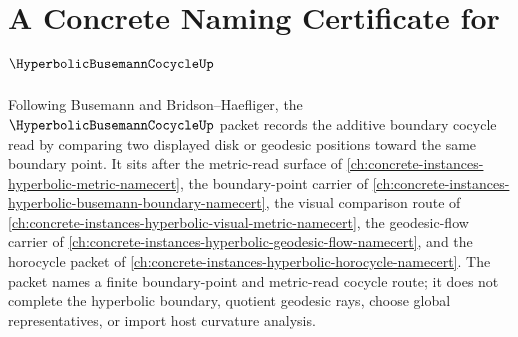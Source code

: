 \chapter{A Concrete Naming Certificate for $\HyperbolicBusemannCocycleUp$}
\label{ch:concrete-instances-hyperbolic-busemann-cocycle-namecert}

Following Busemann and Bridson--Haefliger, the $\HyperbolicBusemannCocycleUp$ packet records the additive boundary cocycle read by comparing two displayed disk or geodesic positions toward the same boundary point. It sits after the metric-read surface of \autoref{ch:concrete-instances-hyperbolic-metric-namecert}, the boundary-point carrier of \autoref{ch:concrete-instances-hyperbolic-busemann-boundary-namecert}, the visual comparison route of \autoref{ch:concrete-instances-hyperbolic-visual-metric-namecert}, the geodesic-flow carrier of \autoref{ch:concrete-instances-hyperbolic-geodesic-flow-namecert}, and the horocycle packet of \autoref{ch:concrete-instances-hyperbolic-horocycle-namecert}. The packet names a finite boundary-point and metric-read cocycle route; it does not complete the hyperbolic boundary, quotient geodesic rays, choose global representatives, or import host curvature analysis.

